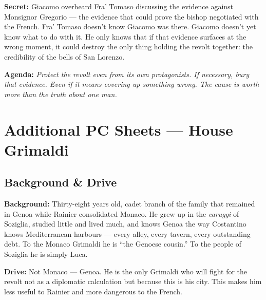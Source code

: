 \clearpage
\begin{secretbox}
\textbf{Secret:} Giacomo overheard Fra' Tomaso discussing the evidence against Monsignor
Gregorio --- the evidence that could prove the bishop negotiated with the French.
Fra' Tomaso doesn't know Giacomo was there. Giacomo doesn't yet know what to do
with it. He only knows that if that evidence surfaces at the wrong moment, it could
destroy the only thing holding the revolt together: the credibility of the bells
of San Lorenzo.

\medskip\noindent\textcolor{SecretRed}{\textbf{Agenda:}}
\textit{Protect the revolt even from its own protagonists. If necessary, bury that
evidence. Even if it means covering up something wrong. The cause is worth more than
the truth about one man.}
\end{secretbox}

\clearpage


\chapter{Additional PC Sheets --- House Grimaldi}


\section*{Background \& Drive}
\begin{rulebox}{}
\textbf{Background:} Thirty-eight years old, cadet branch of the family that remained
in Genoa while Rainier consolidated Monaco. He grew up in the \textit{caruggi} of
Soziglia, studied little and lived much, and knows Genoa the way Costantino knows
Mediterranean harbours --- every alley, every tavern, every outstanding debt.
To the Monaco Grimaldi he is ``the Genoese cousin.'' To the people of Soziglia
he is simply Luca.

\medskip\noindent\textcolor{GrimaldiPurple}{\textbf{Drive:}} Not Monaco --- Genoa.
He is the only Grimaldi who will fight for the revolt not as a diplomatic calculation
but because this is his city. This makes him less useful to Rainier and more dangerous
to the French.
\end{rulebox}

